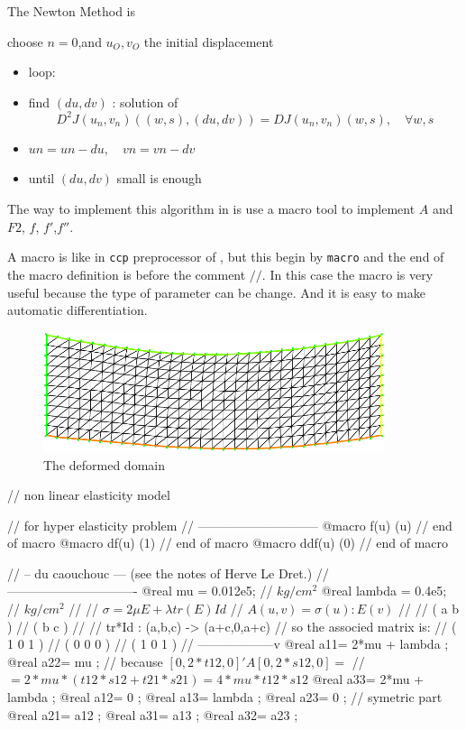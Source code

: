 \documentclass[a4paper,twoside,12pt]{book}
\begin{document}
The Newton Method is

choose $ n=0$,and $u_O,v_O$ the initial displacement
\begin{itemize}
\item loop: \\
\item  \hspace{1cm}    find $(du,dv)$ :  solution of
$$ D^2J(u_n,v_n)((w,s),(du,dv)) =  DJ(u_n,v_n)(w,s) , \quad \forall w,s $$
\item  \hspace{1cm}      $un =un - du,\quad vn =vn - dv$
\item  \hspace{1cm}      until $(du,dv)$ small is enough
\end{itemize}

\color{black}The way to implement this algorithm in \freefempp is
use a macro tool to implement  $A$ and $F2$, $f$, $f'$,$f''$.

A macro\label{macro} is like in \texttt{ccp} preprocessor of \Cpp, but this begin by
\texttt{macro} and the end of the macro definition is before  the comment $//$.
In this case the macro is very useful because the type of parameter can be change.
And it is easy to make automatic differentiation.
\begin{figure}[hbt]
\begin{center}\includegraphics[width=10cm]{nl-elas}\end{center}
\caption{\label{fig nl-elas} The deformed domain}
\end{figure}

\bFF
//  non linear elasticity model

//  for hyper elasticity problem
//  -----------------------------
@macro f(u) (u) // end of macro
@macro df(u) (1) // end of macro
@macro ddf(u) (0) // end of macro

//  -- du caouchouc --- (see the notes of Herve Le Dret.)
// -------------------------------
@real mu = 0.012e5; //  $kg/cm^2$
@real lambda =  0.4e5; //  $kg/cm^2$
//   \hfilll
//   $  \sigma = 2 \mu E + \lambda tr(E) Id $\hfilll
//   $   A(u,v)= \sigma(u):E(v) $\hfilll
//   \hfilll
//   ( a b )\hfilll
//   ( b c )\hfilll
//\hfilll
//  tr*Id : (a,b,c) -> (a+c,0,a+c) \hfilll
// so the associed matrix is:\hfilll
//   ( 1 0 1 )\hfilll
//   ( 0 0 0 )\hfilll
//   ( 1 0 1 ) \hfilll
// ------------------v
@real a11= 2*mu +  lambda  ;
@real a22= mu ; //  because $[0,2*t12,0]' A [0,2*s12,0]  =$
// $= 2*mu*(t12*s12+t21*s21) = 4*mu*t12*s12$
@real a33= 2*mu +   lambda ;
@real a12= 0 ;
@real a13= lambda ;
@real a23= 0 ;
//  symetric part
@real a21= a12 ;
@real a31= a13 ;
@real a32= a23 ;
\end{document}
